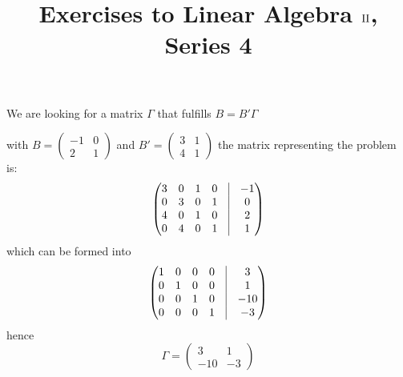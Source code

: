 \documentclass[a4paper,10pt]{article}
\title{Exercises to Linear Algebra $\RN{2}$,\\
Series 4}
\author{\MyDetails}
\begin{document}
\maketitle
\setcounter{section}{4}
\subsection{}
\label{sec:one}
We are looking for a matrix $\Gamma$ that fulfills $ B=B'\Gamma $

with $B= \begin{pmatrix}
-1&0\\2&1
\end{pmatrix}$ and $B'= \begin{pmatrix}
3&1\\4&1
\end{pmatrix}$
the matrix representing the problem is:
\[ \begin{pmatrix}
3&0&1&0&\vline&-1\\
0&3&0&1&\vline&0\\
4&0&1&0&\vline&2\\
0&4&0&1&\vline&1\\
\end{pmatrix}\]
which can be formed into
\[ \begin{pmatrix}
1&0&0&0&\vline&3\\
0&1&0&0&\vline&1\\
0&0&1&0&\vline&-10\\
0&0&0&1&\vline&-3\\
\end{pmatrix}\]
hence \[ \Gamma= \begin{pmatrix}
3&1\\-10&-3
\end{pmatrix}\]
\end{document}
